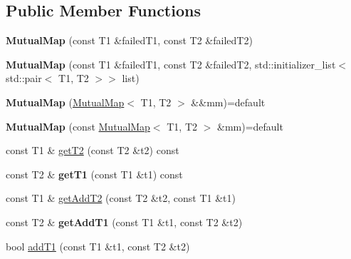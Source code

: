 \subsection*{Public Member Functions}
\begin{DoxyCompactItemize}
\item 
\mbox{\label{classx2_1_1_mutual_map_a0aec006dfe740b3aca9b8f5cd3ede3e0}} 
{\bfseries Mutual\+Map} (const T1 \&failed\+T1, const T2 \&failed\+T2)
\item 
\mbox{\label{classx2_1_1_mutual_map_acb2a15b336a6c70edd3d4fe9a26ee546}} 
{\bfseries Mutual\+Map} (const T1 \&failed\+T1, const T2 \&failed\+T2, std\+::initializer\+\_\+list$<$ std\+::pair$<$ T1, T2 $>$$>$ list)
\item 
\mbox{\label{classx2_1_1_mutual_map_a0f8373a36782451417531b32de7ede92}} 
{\bfseries Mutual\+Map} (\hyperlink{classx2_1_1_mutual_map}{Mutual\+Map}$<$ T1, T2 $>$ \&\&mm)=default
\item 
\mbox{\label{classx2_1_1_mutual_map_ac22842edf0d0c2ff714ecf863162d614}} 
{\bfseries Mutual\+Map} (const \hyperlink{classx2_1_1_mutual_map}{Mutual\+Map}$<$ T1, T2 $>$ \&mm)=default
\item 
const T1 \& \hyperlink{classx2_1_1_mutual_map_acff746e0227b363d23d7a854a9673d44}{get\+T2} (const T2 \&t2) const
\item 
\mbox{\label{classx2_1_1_mutual_map_ad0e2ed1c35c156ac7f379c737ea2a98d}} 
const T2 \& {\bfseries get\+T1} (const T1 \&t1) const
\item 
const T1 \& \hyperlink{classx2_1_1_mutual_map_aba13a2fb8bd6343efc7874da48c5156c}{get\+Add\+T2} (const T2 \&t2, const T1 \&t1)
\item 
\mbox{\label{classx2_1_1_mutual_map_aebbfcc0501af0e6080f71d6ca4c468df}} 
const T2 \& {\bfseries get\+Add\+T1} (const T1 \&t1, const T2 \&t2)
\item 
bool \hyperlink{classx2_1_1_mutual_map_ac9572b3e52982e24e77978ee7e3ab44b}{add\+T1} (const T1 \&t1, const T2 \&t2)
\item 
\mbox{\label{classx2_1_1_mutual_map_a3aff757ccd0b3c5adf5d91dd9b792bfd}} 
$$
\end{DoxyCompactItemize}
